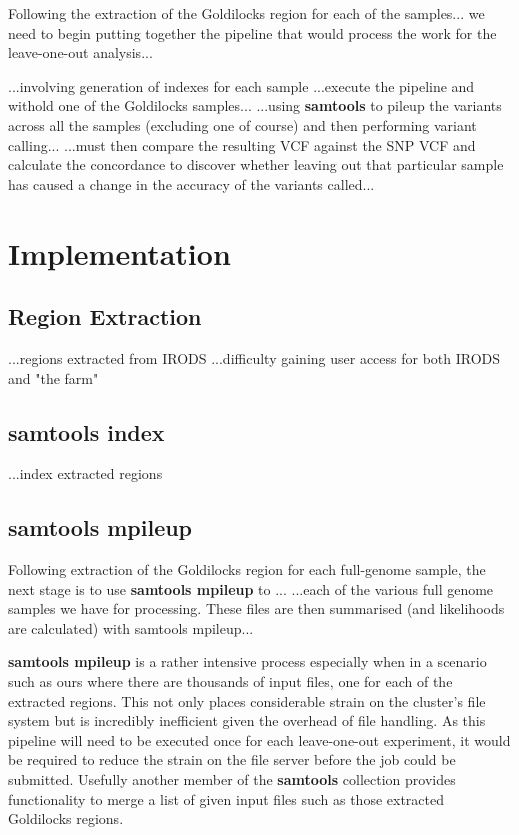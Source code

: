 Following the extraction of the Goldilocks region for each of the samples... we
need to begin putting together the pipeline that would process the work for the
leave-one-out analysis...


...involving generation of indexes for each sample
...execute the pipeline and withold one of the Goldilocks samples...
...using \textbf{samtools} to pileup the variants across all the samples
(excluding one of course) and then performing variant calling...
...must then compare the resulting VCF against the SNP VCF and calculate the
concordance to discover whether leaving out that particular sample has caused a
change in the accuracy of the variants called...


\section{Implementation}
\subsection{Region Extraction}

...regions extracted from IRODS
...difficulty gaining user access for both IRODS and "the farm"


\subsection{samtools index}

...index extracted regions


\subsection{samtools mpileup}

Following extraction of the Goldilocks region for each full-genome sample, the
next stage is to use \textbf{samtools mpileup} to ...
...each of the various full genome samples we have for processing.  These files
are then summarised (and likelihoods are calculated) with samtools mpileup...

\textbf{samtools mpileup} is a rather intensive process especially when in a
scenario such as ours where there are thousands of input files, one for each of
the extracted regions. This not only places considerable strain on the cluster's
file system but is incredibly inefficient given the overhead of file handling.
As this pipeline will need to be executed once for each leave-one-out
experiment, it would be required to reduce the strain on the file server before
the job could be submitted. Usefully another member of the \textbf{samtools}
collection provides functionality to merge a list of given input files such as
those extracted Goldilocks regions.

